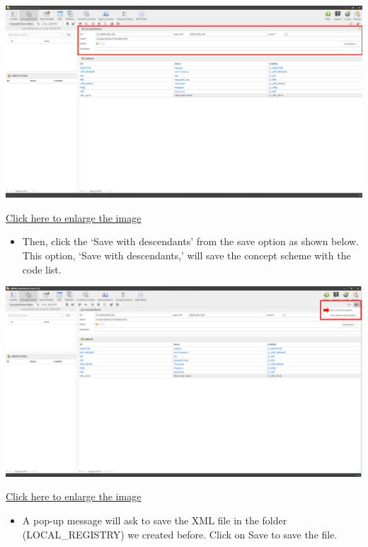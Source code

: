 \documentclass[
]{book}
\providecommand{\tightlist}{%
  \setlength{\itemsep}{0pt}\setlength{\parskip}{0pt}}
\begin{document}
\begin{center}\includegraphics[width=1\linewidth]{./images/image116} \end{center}

\href{images/image116.png}{Click here to enlarge the image}

\begin{itemize}
\tightlist
\item
  Then, click the `Save with descendants' from the save option as shown below. This option, `Save with descendants,' will save the concept scheme with the code list.
\end{itemize}

\begin{center}\includegraphics[width=1\linewidth]{./images/image118} \end{center}

\href{images/image118.png}{Click here to enlarge the image}

\begin{itemize}
\tightlist
\item
  A pop-up message will ask to save the XML file in the folder (LOCAL\_REGISTRY) we created before. Click on Save to save the file.
\end{itemize}
\end{document}

